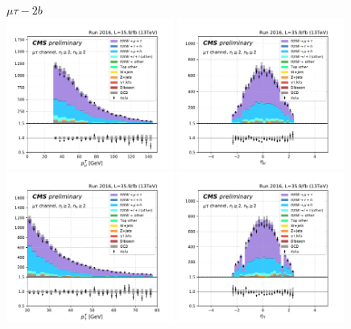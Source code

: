\begin{figure}[ht]
    \centering
    $\mu\tau - 2b$ \\
    \includegraphics[width=0.49\textwidth]{chapters/Analysis/sectionPlots/figures/kinematics_pickles/mutau/2b/mutau_2b_lepton1_pt.pdf}
    \includegraphics[width=0.49\textwidth]{chapters/Analysis/sectionPlots/figures/kinematics_pickles/mutau/2b/mutau_2b_lepton1_eta.pdf}
    \includegraphics[width=0.49\textwidth]{chapters/Analysis/sectionPlots/figures/kinematics_pickles/mutau/2b/mutau_2b_lepton2_pt.pdf}
    \includegraphics[width=0.49\textwidth]{chapters/Analysis/sectionPlots/figures/kinematics_pickles/mutau/2b/mutau_2b_lepton2_eta.pdf}

\end{figure}
